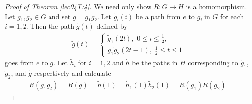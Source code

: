 \begin{proof}[Proof of Theorem \ref{lec04T:4}]
We need only show $R:G \to H$ is a homomorphism.  Let $g_1, g_2 \in G$ and set $g =
g_1g_2$.  Let $\tilde{g}_i(t)$ be a path from $e$ to $g_i$ in $G$ for each $i = 1,2$.
Then the path $\tilde{g}(t)$ defined by
\begin{eqnarray*}
\tilde{g}(t) = \left\{ \begin{array}{l} \tilde{g}_1(2t), \,\, 0 \leq t
  \leq \frac{1}{2}, \\ g_1 \tilde{g}_2(2t-1), \,\, \frac{1}{2} \leq t
  \leq 1 \end{array} \right.
\end{eqnarray*}
goes from $e$ to $g$.  Let $\tilde{h}_i$ for $i = 1,2$ and $\tilde{h}$ be the paths in
$H$ corresponding to $\tilde{g}_1$, $\tilde{g}_2$, and $\tilde{g}$ respectively and
calculate
\begin{eqnarray*}
R(g_1 g_2) = R(g) = \tilde{h}(1) = \tilde{h}_1(1) \tilde{h}_2(1) = R(g_1) R(g_2).
\end{eqnarray*}
\end{proof}

